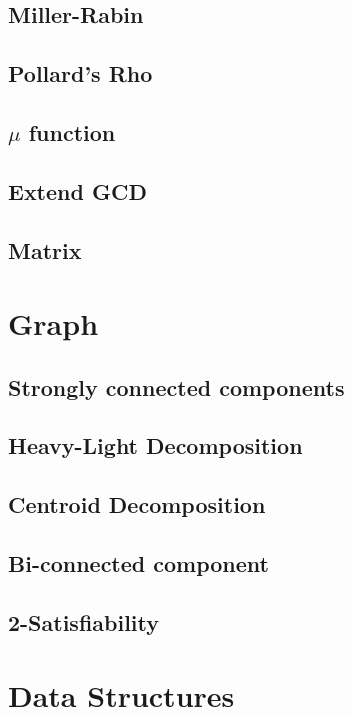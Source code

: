 \documentclass[a4paper,10pt,twocolumn,oneside]{article}
\begin{document}
\subsection{Miller-Rabin}

\subsection{Pollard's Rho}

\subsection{$\mu$ function}

\subsection{Extend GCD}

\subsection{Matrix}

\section{Graph}
\subsection{Strongly connected components}

\subsection{Heavy-Light Decomposition}

\subsection{Centroid Decomposition}

\subsection{Bi-connected component}

\subsection{2-Satisfiability}

\section{Data Structures}
\end{document}
